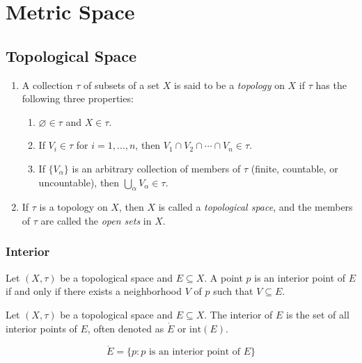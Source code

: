 \section{Metric Space}

\subsection{Topological Space}

\begin{definition}
\leavevmode
\begin{enumerate}
    \item A collection $\tau$ of subsets of a set $X$ is said to be a \emph{topology} on $X$ if $\tau$ has the following three properties:
    \begin{enumerate}
        \item $\varnothing \in \tau$ and $X \in \tau$.
        \item If $V_i \in \tau$ for $i = 1, \dots, n$, then $V_1 \cap V_2 \cap \cdots \cap V_n \in \tau$.
        \item If $\{ V_\alpha \}$ is an arbitrary collection of members of $\tau$ (finite, countable, or uncountable), then $\bigcup_\alpha V_\alpha \in \tau$.
    \end{enumerate}

    \item If $\tau$ is a topology on $X$, then $X$ is called a \emph{topological space}, and the members of $\tau$ are called the \emph{open sets} in $X$.
\end{enumerate}
\end{definition}

\subsubsection{Interior}

\begin{definition}\label{fc673441}
    Let $(X, \tau)$ be a topological space and $E \subseteq X$. A point $p$ is an interior point of $E$ if and only if there exists a neighborhood $V$ of $p$ such that $V \subseteq E$.
\end{definition}


\begin{definition}[Interior]
    Let $(X, \tau)$ be a topological space and $E \subseteq X$. The interior of $E$ is the set of all interior points of $E$, often
    denoted as $\mathring{E}$ or $\mathrm{int}(E)$.

    \[
\mathring{E} = \{ p : p \text{ is an interior point of } E \}
    \]

\end{definition}

